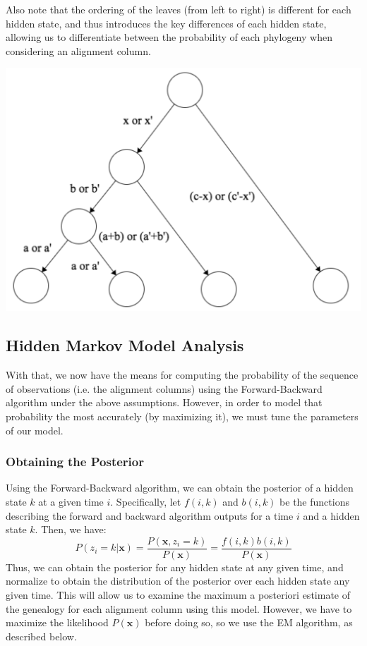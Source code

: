 \documentclass[12pt]{article}
\begin{document}
    Also note that the ordering of the leaves (from left to right) is different for each hidden state, and thus introduces the key differences of each hidden state, allowing us to differentiate between the probability of each phylogeny when considering an alignment column.
    \begin{center}
    \includegraphics[scale=0.5]{phyl}
    \end{center}
    \subsection{Hidden Markov Model Analysis}
    With that, we now have the means for computing the probability of the sequence of observations (i.e. the alignment columns) using the Forward-Backward algorithm under the above assumptions. However, in order to model that probability the most accurately (by maximizing it), we must tune the parameters of our model.
    \subsubsection{Obtaining the Posterior}
    Using the Forward-Backward algorithm, we can obtain the posterior of a hidden state $k$ at a given time $i$. Specifically, let $f(i, k)$ and $b(i, k)$ be the functions describing the forward and backward algorithm outputs for a time $i$ and a hidden state $k$. Then, we have:
    $$P(z_i = k | \textbf{x}) = \frac{P(\textbf{x}, z_i = k)}{P(\textbf{x})} = \frac{f(i, k)b(i, k)}{P(\textbf{x})}$$
    Thus, we can obtain the posterior for any hidden state at any given time, and normalize to obtain the distribution of the posterior over each hidden state any given time. This will allow us to examine the maximum a posteriori estimate of the genealogy for each alignment column using this model. However, we have to maximize the likelihood $P(\textbf{x})$ before doing so, so we use the EM algorithm, as described below.
\end{document}
